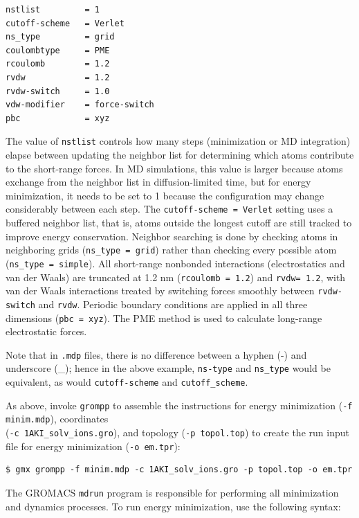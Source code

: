 \documentclass[9pt,tutorial,pubversion]{livecoms}
\begin{document}
\begin{lstlisting}
nstlist         = 1
cutoff-scheme   = Verlet
ns_type         = grid
coulombtype     = PME
rcoulomb        = 1.2
rvdw            = 1.2
rvdw-switch     = 1.0
vdw-modifier    = force-switch
pbc             = xyz
\end{lstlisting}
%
The value of \texttt{nstlist} controls how many steps (minimization or MD integration) elapse between updating the neighbor list for determining which atoms contribute to the short-range forces. In MD simulations, this value is larger because atoms exchange from the neighbor list in diffusion-limited time, but for energy minimization, it needs to be set to 1 because the configuration may change considerably between each step. The \texttt{cutoff-scheme = Verlet} setting uses a buffered neighbor list, that is, atoms outside the longest cutoff are still tracked to improve energy conservation. Neighbor searching is done by checking atoms in neighboring grids (\texttt{ns\_type = grid}) rather than checking every possible atom (\texttt{ns\_type = simple}). All short-range nonbonded interactions (electrostatics and van der Waals) are truncated at 1.2 nm (\texttt{rcoulomb = 1.2}) and \texttt{rvdw= 1.2}, with van der Waals interactions treated by switching forces smoothly between \texttt{rvdw-switch} and \texttt{rvdw}. Periodic boundary conditions are applied in all three dimensions (\texttt{pbc = xyz}). The PME method is used to calculate long-range electrostatic forces.

Note that in \texttt{.mdp} files, there is no difference between a hyphen (-) and underscore (\_); hence in the above example, \texttt{ns-type} and \texttt{ns\_type} would be equivalent, as would \texttt{cutoff-scheme} and \texttt{cutoff\_scheme}.

As above, invoke \texttt{grompp} to assemble the instructions for energy minimization (\texttt{-f minim.mdp}), coordinates \\(\texttt{-c 1AKI\_solv\_ions.gro}), and topology (\texttt{-p topol.top}) to create the run input file for energy minimization (\texttt{-o em.tpr}):

\begin{lstlisting}
$ gmx grompp -f minim.mdp -c 1AKI_solv_ions.gro -p topol.top -o em.tpr
\end{lstlisting}

The GROMACS \texttt{mdrun} program is responsible for performing all minimization and dynamics processes. To run energy minimization, use the following syntax:
\end{document}
